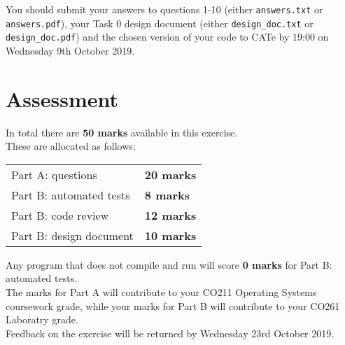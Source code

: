 \documentclass[a4paper,12pt]{article}
\newcommand{\shell}[1]{\lstinline!#1!}
\begin{document}
You should submit your answers to questions 1-10 (either \shell{answers.txt} or \shell{answers.pdf}), your Task 0 design document (either \shell{design_doc.txt} or \shell{design_doc.pdf}) and the chosen version of your code to CATe by 19:00 on Wednesday 9th October 2019.\\


\section*{Assessment}
In total there are {\bf 50 marks} available in this exercise.\\
These are allocated as follows:
%
\begin{center}
\begin{tabular}{l@{\qquad\qquad}l}
  Part A: questions       & {\bf 20 marks} \\
  Part B: automated tests & {\bf 8 marks} \\
  Part B: code review     & {\bf 12 marks} \\
  Part B: design document & {\bf 10 marks} \\    
\end{tabular}
\end{center}
%
Any program that does not compile and run will score {\bf 0 marks} for Part B: automated tests.\\[-0.8em]

\noindent The marks for Part A will contribute to your CO211 Operating Systems coursework grade,
while your marks for Part B will contribute to your CO261 Laboratry grade.\\[-0.8em]


\noindent Feedback on the exercise will be returned by Wednesday 23rd October 2019.


\end{document}
